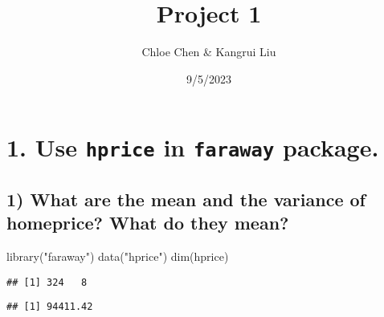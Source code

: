 \documentclass[
  12pt,
]{article}
\title{Project 1}
\author{Chloe Chen \& Kangrui Liu}
\date{9/5/2023}
\newenvironment{Shaded}{\begin{snugshade}}{\end{snugshade}}
\newcommand{\DecValTok}[1]{\textcolor[rgb]{0.00,0.00,0.81}{#1}}
\newcommand{\FunctionTok}[1]{\textcolor[rgb]{0.00,0.00,0.00}{#1}}
\newcommand{\NormalTok}[1]{#1}
\newcommand{\OtherTok}[1]{\textcolor[rgb]{0.56,0.35,0.01}{#1}}
\newcommand{\SpecialCharTok}[1]{\textcolor[rgb]{0.00,0.00,0.00}{#1}}
\newcommand{\StringTok}[1]{\textcolor[rgb]{0.31,0.60,0.02}{#1}}
\begin{document}
\maketitle

\hypertarget{use-in-package.}{%
\section{\texorpdfstring{1. Use \texttt{hprice} in \texttt{faraway}
package.}{1. Use  in  package.}}\label{use-in-package.}}

\hypertarget{what-are-the-mean-and-the-variance-of-homeprice-what-do-they-mean}{%
\subsection{1) What are the mean and the variance of homeprice? What do
they
mean?}\label{what-are-the-mean-and-the-variance-of-homeprice-what-do-they-mean}}

\begin{Shaded}
\begin{Highlighting}[]
\FunctionTok{library}\NormalTok{(}\StringTok{"faraway"}\NormalTok{)}
\FunctionTok{data}\NormalTok{(}\StringTok{"hprice"}\NormalTok{)}
\FunctionTok{dim}\NormalTok{(hprice)}
\end{Highlighting}
\end{Shaded}

\begin{verbatim}
## [1] 324   8
\end{verbatim}

\begin{Shaded}
\end{Shaded}

\begin{verbatim}
## [1] 94411.42
\end{verbatim}

\begin{Shaded}
\end{Shaded}
\end{document}
